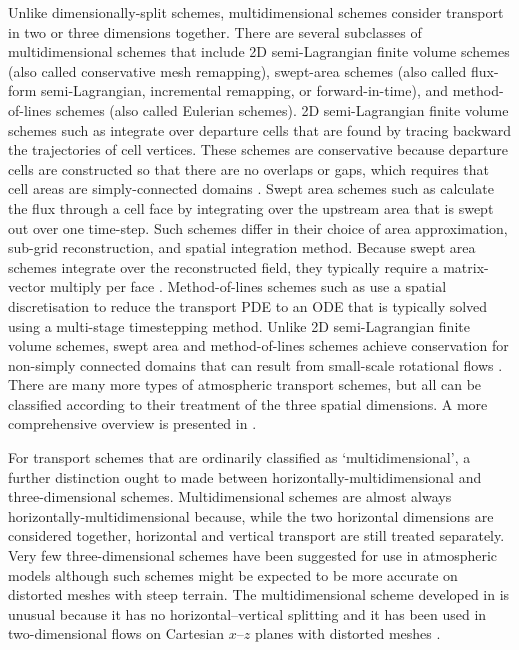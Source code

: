 Unlike dimensionally-split schemes, multidimensional schemes consider transport in two or three dimensions together.
There are several subclasses of multidimensional schemes that include
2D semi-Lagrangian finite volume schemes (also called conservative mesh remapping),
swept-area schemes (also called flux-form semi-Lagrangian, incremental remapping, or forward-in-time),
and method-of-lines schemes (also called Eulerian schemes).
2D semi-Lagrangian finite volume schemes such as \citep{iske-kaeser2004,lauritzen2010} integrate over departure cells that are found by tracing backward the trajectories of cell vertices.  These schemes are conservative because departure cells are constructed so that there are no overlaps or gaps, which requires that cell areas are simply-connected domains \citep{lauritzen2011book}.
Swept area schemes such as \citep{lashley2002,skamarock-menchaca2010,lauritzen2011,thuburn2014} calculate the flux through a cell face by integrating over the upstream area that is swept out over one time-step.  Such schemes differ in their choice of area approximation, sub-grid reconstruction, and spatial integration method.
Because swept area schemes integrate over the reconstructed field, they typically require a matrix-vector multiply per face \citep{thuburn2014,skamarock-menchaca2010}.
Method-of-lines schemes such as \citep{weller2009,skamarock-gassmann2011} use a spatial discretisation to reduce the transport PDE to an ODE that is typically solved using a multi-stage timestepping method.  
Unlike 2D semi-Lagrangian finite volume schemes, swept area and method-of-lines schemes achieve conservation for non-simply connected domains that can result from small-scale rotational flows \citep{lauritzen2011}.
There are many more types of atmospheric transport schemes, but all can be classified according to their treatment of the three spatial dimensions.  A more comprehensive overview is presented in \cite{lauritzen2014}.

For transport schemes that are ordinarily classified as `multidimensional', a further distinction ought to made between horizontally-multidimensional and three-dimensional schemes.
Multidimensional schemes are almost always horizontally-multidimensional because, while the two horizontal dimensions are considered together, horizontal and vertical transport are still treated separately.
Very few three-dimensional schemes have been suggested for use in atmospheric models \citep[e.g.][]{miura2007,yeh2007,gassmann2013} although such schemes might be expected to be more accurate on distorted meshes with steep terrain.
The multidimensional scheme developed in \citep{weller-shahrokhi2014} is unusual because it has no horizontal--vertical splitting and it has been used in two-dimensional flows on Cartesian $x$--$z$ planes with distorted meshes \citep{shaw-weller2016,weller2017}.

